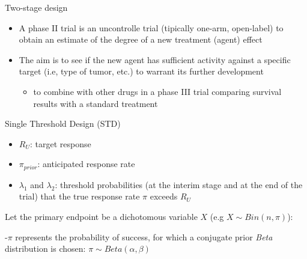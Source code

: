 \documentclass{beamer}
\begin{document}
\begin{frame}{Two-stage design}

\begin{itemize}
\item
  A phase II trial is an uncontrolle trial (tipically one-arm,
  open-label) to obtain an estimate of the degree of a new treatment
  (agent) effect
\item
  The aim is to see if the new agent has sufficient activity against a
  specific target (i.e, type of tumor, etc.) to warrant its further
  development

  \begin{itemize}
  \itemsep1pt\parskip0pt
  \item
    to combine with other drugs in a phase III trial comparing survival
    results with a standard treatment
  \end{itemize}
\end{itemize}

\end{frame}

\begin{frame}{Single Threshold Design (STD)}

\begin{itemize}
\itemsep1pt\parskip0pt
\item
  \(R_U\): target response
\item
  \(\pi_{prior}\): anticipated response rate
\item
  \(\lambda_1\) and \(\lambda_2\): threshold probabilities (at the
  interim stage and at the end of the trial) that the true response rate
  \(\pi\) exceeds \(R_U\)
\end{itemize}

Let the primary endpoint be a dichotomous variable \(X\) (e.g
\(X\sim Bin(n,\pi)\)):

-\(\pi\) represents the probability of success, for which a conjugate
prior \emph{Beta} distribution is chosen:
\(\pi\sim Beta(\alpha, \beta)\)

\end{frame}
\end{document}
